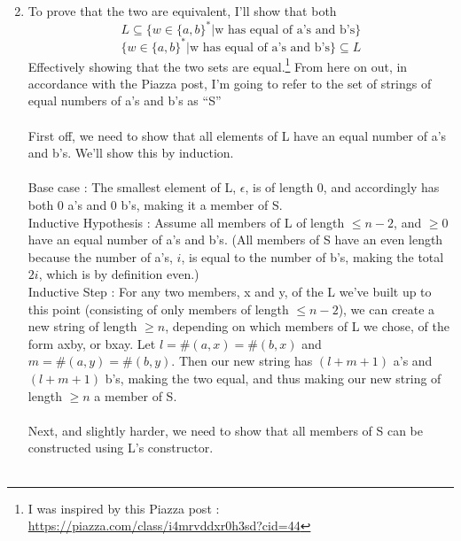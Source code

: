 
\usepackage{amsmath, hyperref}

\oddsidemargin 0in
\evensidemargin 0in
\textwidth 6.5in
\topmargin -0.5in
\textheight 9.0in
\newcommand{\norm}[1]{\left\lVert #1 \right\rVert}


\pagestyle{myheadings}


\begin{enumerate}
  \setcounter{enumi}{1}
\item
  
  To prove that the two are equivalent, I'll show that both
  $$L \subseteq \{w \in \{a,b\}^* | \text{w has equal of a's and b's}\}$$
  $$\{w \in \{a,b\}^* | \text{w has equal of a's and b's}\} \subseteq L$$
  Effectively showing that the two sets are equal.\footnote{I was inspired by this Piazza post : \url{https://piazza.com/class/i4mrvddxr0h3sd?cid=44}} From here on out, in accordance with the Piazza post, I'm going to refer to the set of strings of equal numbers of a's and b's as ``S''\\\\

  First off, we need to show that all elements of L have an equal number of a's and b's. We'll show this by induction.\\\\

  Base case : The smallest element of L, $\epsilon$, is of length 0, and accordingly has both 0 a's and 0 b's, making it a member of S.\\

  Inductive Hypothesis : Assume all members of L of length $\leq n-2$, and $\geq 0$ have an equal number of a's and b's. (All members of S have an even length because the number of a's, $i$, is equal to the number of b's, making the total $2i$, which is by definition even.)\\

  Inductive Step : For any two members, x and y, of the L we've built up to this point (consisting of only members of length $\leq n-2$), we can create a new string of length $\geq n$, depending on which members of L we chose, of the form axby, or bxay. Let $l = \#(a,x) = \#(b,x)$ and $m = \#(a,y) = \#(b,y)$. Then our new string has $(l+m+1)$ a's and $(l+m+1)$ b's, making the two equal, and thus making our new string of length $\geq n$ a member of S.\\\\

  Next, and slightly harder, we need to show that all members of S can be constructed using L's constructor.\\\\


\end{enumerate}
